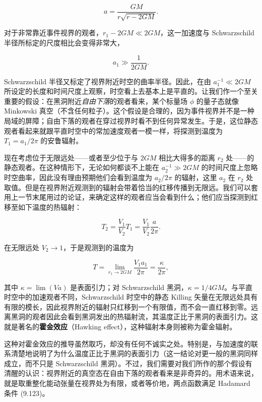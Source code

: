 \begin{equation*}
a = \frac{GM}{r\sqrt{r - 2GM}}.
\tag{9.170}
\end{equation*}

对于非常靠近事件视界的观者，$r_{1} - 2GM \ll 2GM$，这一加速度与 Schwarzschild 半径所标定的尺度相比会变得非常大，

\begin{equation*}
a_{1} \gg \frac{1}{2GM}.
\tag{9.171}
\end{equation*}

Schwarzschild 半径又标定了视界附近时空的曲率半径。因此，在由 $a_{1}^{-1} \ll 2GM$ 所设定的长度和时间尺度上观察，时空看上去基本上是平直的。让我们作一个至关重要的假设：在黑洞附近\emph{自由下落}的观者看来，某个标量场 $\phi$ 的量子态就像 Minkowski 真空（不含任何粒子）。这个假设是合理的，因为事件视界并不是一种局域的屏障；自由下落的观者在穿过视界时看不到任何异常发生。于是，这位静态观者看起来就跟平直时空中的常加速度观者一模一样，将探测到温度为 $T_{1} = a_{1}/2\pi$ 的安鲁辐射。

现在考虑位于无限远处——或者至少位于与 $2GM$ 相比大得多的距离 $r_{2}$ 处——的静态观者。在这种情形下，无论如何都谈不上能在 $a_{2}^{-1} \gg 2GM$ 的时间尺度上忽略时空曲率，因此没有理由预期他们会看到温度为 $a_{2}/2\pi$ 的辐射，这里 $a_{2}$ 在 $r_{2}$ 处取值。但是在视界附近观测到的辐射会带着恰当的红移传播到无限远。我们可以套用上一节末尾用过的论证，来确定这样的观者应当会看到什么；他们应当探测到红移至如下温度的热辐射：

\begin{equation*}
T_{2} = \frac{V_{1}}{V_{2}} T_{1} = \frac{V_{1}}{V_{2}} \frac{a}{2\pi}.
\tag{9.172}
\end{equation*}

在无限远处 $V_{2} \to 1$，于是观测到的温度为

\begin{equation*}
T = \lim_{r_{1} \to 2GM} \frac{V_{1} a_{1}}{2\pi} = \frac{\kappa}{2\pi},
\tag{9.173}
\end{equation*}

其中 $\kappa = \lim(Va)$ 是表面引力；对 Schwarzschild 黑洞，$\kappa = 1/4GM$。与平直时空中的加速观者不同，Schwarzschild 时空中的静态 Killing 矢量在无限远处具有有限的模长，因此视界附近的辐射只红移到一个有限值，而不会一直红移到零。远离黑洞的观者因此会看到黑洞发出的热辐射流，其温度正比于黑洞的表面引力。这就是著名的\textbf{霍金效应}（Hawking effect），这种辐射本身则被称为霍金辐射。

这种对霍金效应的推导虽然取巧，却没有任何不诚实之处。特别是，与加速度的联系清楚地说明了为什么温度正比于黑洞的表面引力（这一结论对更一般的黑洞同样成立，而不只是 Schwarzschild 黑洞）。不过，我们需要对我们所作的那个假设有清醒的认识：视界附近的真空态在自由下落的观者看来是非奇异的。用术语来说，就是取重整化能动张量在视界处为有限，或者等价地，两点函数满足 Hadamard 条件 (9.123)。

